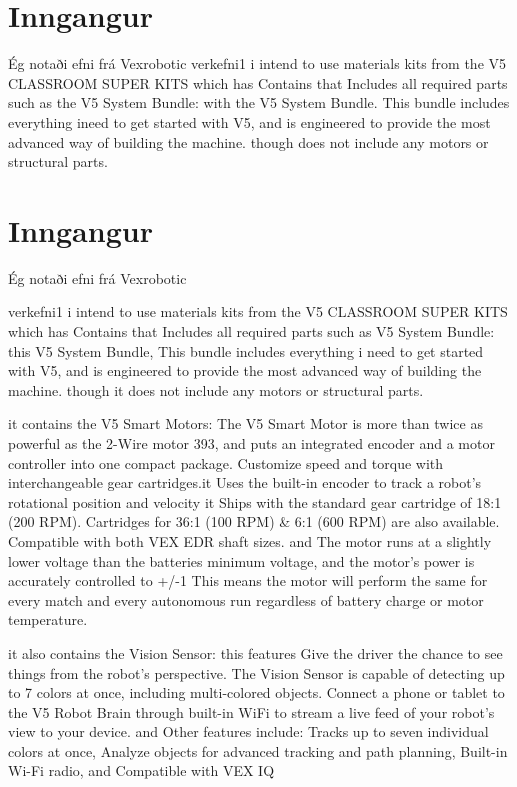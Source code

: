 \section{Inngangur}
  
Ég notaði  efni frá Vexrobotic \cite{vexrobotics} 
verkefni1
	i intend to use materials kits from the V5 CLASSROOM SUPER KITS which has Contains that Includes all required parts such as 
	the V5 System Bundle: with the V5 System Bundle. 
	This bundle includes everything ineed to get started with V5, 
	and is engineered to provide the most advanced way of building the machine. 
	though does not include any motors or structural parts.
	 \section{Inngangur}
  
Ég notaði  efni frá Vexrobotic \cite{vexrobotics} 

verkefni1
	i intend to use materials kits from the V5 CLASSROOM SUPER KITS which has Contains that Includes all required parts such as 
	V5 System Bundle: this V5 System Bundle,
	This bundle includes everything i need to get started with V5, 
	and is engineered to provide the most advanced way of building the machine. 
	though it does not include any motors or structural parts.

	it contains the V5 Smart Motors: The V5 Smart Motor is more than twice as powerful as the 2-Wire motor 393, 
	and puts an integrated encoder and a motor controller into one compact package. 
	Customize speed and torque with interchangeable gear cartridges.it Uses the built-in encoder to track a robot's rotational position and velocity
	it Ships with the standard gear cartridge of 18:1 (200 RPM).
	Cartridges for 36:1 (100 RPM) & 6:1 (600 RPM) are also available. Compatible with both VEX EDR shaft sizes. and
	The motor runs at a slightly lower voltage than the batteries minimum voltage, and the motor's power is accurately controlled to +/-1%
	This means the motor will perform the same for every match and every autonomous run regardless of battery charge or motor temperature.

	it also contains the Vision Sensor: this features Give the driver the chance to see things from the robot's perspective. 
	The Vision Sensor is capable of detecting up to 7 colors at once, including multi-colored objects. 
	Connect a phone or tablet to the V5 Robot Brain through built-in WiFi to stream a live feed of your robot's view to your device. and
	Other features include: Tracks up to seven individual colors at once, Analyze objects for advanced tracking and path planning, Built-in Wi-Fi radio,
	and Compatible with VEX IQ
 
